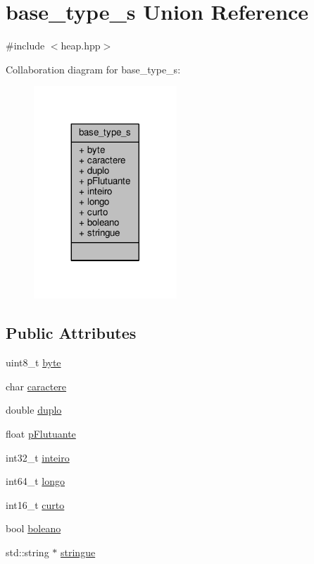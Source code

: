 \hypertarget{unionbase__type__s}{\section{base\+\_\+type\+\_\+s Union Reference}
\label{unionbase__type__s}
}


{\ttfamily \#include $<$heap.\+hpp$>$}



Collaboration diagram for base\+\_\+type\+\_\+s\+:\nopagebreak
\begin{figure}[H]
\begin{center}
\leavevmode
\includegraphics[width=152pt]{unionbase__type__s__coll__graph}
\end{center}
\end{figure}
\subsection*{Public Attributes}
\begin{DoxyCompactItemize}
\item 
uint8\+\_\+t \hyperlink{unionbase__type__s_a0764f45a4f066274e13342daba99a1a9}{byte}
\item 
char \hyperlink{unionbase__type__s_ae87ff5b2ecc7de22ab4012a8c4ee71b7}{caractere}
\item 
double \hyperlink{unionbase__type__s_ab790d7e640db0b9f99c8f1b202cbc1cb}{duplo}
\item 
float \hyperlink{unionbase__type__s_aeb2c8259e1193e8480d6316abe158b0f}{p\+Flutuante}
\item 
int32\+\_\+t \hyperlink{unionbase__type__s_aa8aa0d18e53aaef1b14d4c87779938ba}{inteiro}
\item 
int64\+\_\+t \hyperlink{unionbase__type__s_a1bcfa1e04911f2503e87dacad3d9fe21}{longo}
\item 
int16\+\_\+t \hyperlink{unionbase__type__s_a210f8a1effde127c16d34dd8d45f64e6}{curto}
\item 
bool \hyperlink{unionbase__type__s_a67bd49b04a984ad96792e5b22c8a1cf3}{boleano}
\item 
std\+::string $\ast$ \hyperlink{unionbase__type__s_ab246b2b35057f95ce992e7083086bae5}{stringue}
\end{DoxyCompactItemize}


